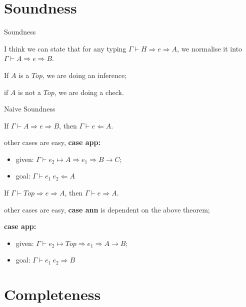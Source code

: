 \section{Soundness}

\begin{frame}{Soundness}

I think we can state that for any typing $\Gamma \vdash H \Rightarrow e \Rightarrow A$, we normalise it into $\Gamma \vdash A \Rightarrow e \Rightarrow B$.

If $A$ is a $Top$, we are doing an inference;

if $A$ is not a $Top$, we are doing a check.

\end{frame}

\begin{frame}{Naive Soundness}
\begin{theorem}
If $\Gamma \vdash A \Rightarrow e \Rightarrow B$, then $\Gamma \vdash e \Leftarrow A$.
\end{theorem}

other cases are easy, \textbf{case app:}
\begin{itemize}
	\item given: $\Gamma \vdash \boxed{e_2} \mapsto A \Rightarrow e_1 \Rightarrow B \rightarrow C$;
	\item goal: $\Gamma \vdash e_1 ~ e_2 \Leftarrow A$
\end{itemize}

\begin{theorem}
If $\Gamma \vdash Top \Rightarrow e \Rightarrow A$, then $\Gamma \vdash e \Rightarrow A$.
\end{theorem}

other cases are easy, \textbf{case ann} is dependent on the above theorem;

\textbf{case app:}

\begin{itemize}
	\item given: $\Gamma \vdash \boxed{e_2} \mapsto Top \Rightarrow e_1 \Rightarrow A \rightarrow B$;
	\item goal: $\Gamma \vdash e_1 ~ e_2 \Rightarrow B$
\end{itemize}

\end{frame}

\section{Completeness}


